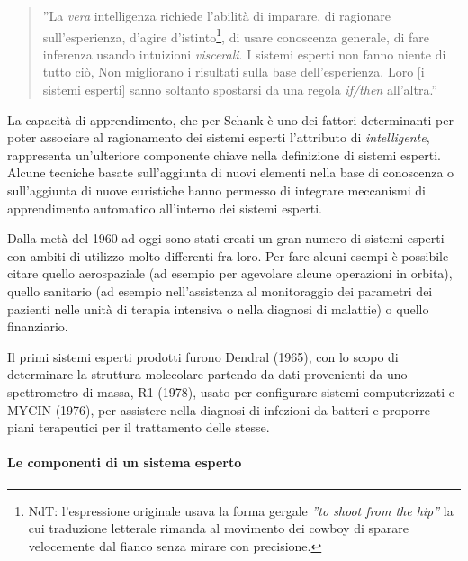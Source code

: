 \begin{quotation}
''La \emph{vera} intelligenza richiede l'abilità di imparare, di ragionare sull'esperienza, d'agire d'istinto\footnote{NdT: l'espressione originale usava la forma gergale \emph{''to shoot from the hip''} la cui traduzione letterale rimanda al movimento dei cowboy di sparare velocemente dal fianco senza mirare con precisione.}, di usare conoscenza generale, di fare inferenza usando intuizioni \emph{viscerali}. I sistemi esperti non fanno niente di tutto ciò, Non migliorano i risultati sulla base dell'esperienza. Loro [i sistemi esperti] sanno soltanto spostarsi da una regola \emph{if/then} all'altra.'' \cite{schank1984ia} 
\end{quotation}

La capacità di apprendimento, che per Schank \cite{schank1984ia} è uno dei fattori determinanti per poter associare al ragionamento dei sistemi esperti l'attributo di \emph{intelligente}, rappresenta un'ulteriore componente chiave nella definizione di sistemi esperti. Alcune tecniche basate sull'aggiunta di nuovi elementi nella base di conoscenza o sull'aggiunta di nuove euristiche hanno permesso di integrare meccanismi di apprendimento automatico all'interno dei sistemi esperti. \cite{nasa1988flops}

Dalla metà del 1960 ad oggi  sono stati creati un gran numero di sistemi esperti con ambiti di utilizzo molto differenti fra loro. Per fare alcuni esempi è possibile citare quello aerospaziale (ad esempio per agevolare alcune operazioni in orbita), quello sanitario (ad esempio nell'assistenza al monitoraggio dei parametri dei pazienti nelle unità di terapia intensiva o nella diagnosi di malattie) o quello finanziario.~\cite{jackson1999}

Il primi sistemi esperti prodotti furono Dendral (1965), con lo scopo di determinare la struttura molecolare partendo da dati provenienti da uno spettrometro di massa, R1 (1978), usato per configurare sistemi computerizzati e MYCIN (1976), per assistere nella diagnosi di infezioni da batteri e proporre piani terapeutici per il trattamento delle stesse.

\paragraph{Le componenti di un sistema esperto} 

